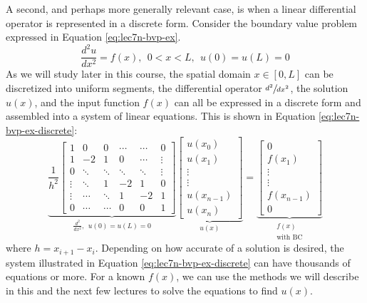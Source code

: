 A second, and perhaps more generally relevant case, is when a linear differential operator is represented in a discrete form.  Consider the boundary value problem expressed in Equation \ref{eq:lec7n-bvp-ex}.
\begin{equation}
\frac{d^2 u}{d x^2} = f(x), \ \ 0 < x < L, \ \ u(0) = u(L) = 0
\label{eq:lec7n-bvp-ex}
\end{equation}
As we will study later in this course, the spatial domain $x \in [0,L]$ can be discretized into uniform segments, the differential operator $\sfrac{d^2}{dx^2}$, the solution $u(x)$, and the input function $f(x)$ can all be expressed in a discrete form and assembled into a system of linear equations.  This is shown in Equation \ref{eq:lec7n-bvp-ex-discrete}:
\begin{equation}
\underbrace{
\frac{1}{h^2}
\left[
\begin{matrix}
1 & 0 & 0 & \cdots & \cdots &  0 \\
1 & -2 & 1 & 0 & \cdots & \vdots \\
0 & \ddots & \ddots & \ddots & \ddots& \vdots \\
\vdots &  \ddots & 1 & -2 & 1 &  0 \\
\vdots & \cdots & \ddots & 1 & -2 & 1  \\
0 & \cdots & \cdots & 0 & 0 & 1
\end{matrix}
\right]
}_{\frac{d^2}{dx^2}, \ \  u(0)=u(L)=0}
\underbrace{
\left[
\begin{matrix}
u(x_0) \\
u(x_1) \\
\vdots \\
\vdots \\
u(x_{n-1}) \\
u(x_n)
\end{matrix}
\right]
}_{u(x)}
=
\underbrace{
\left[
\begin{matrix}
0 \\
f(x_1) \\
\vdots \\
\vdots \\
f(x_{n-1}) \\
0
\end{matrix}
\right]
}_{\substack{f(x) \\ \text{with BC}}}
\label{eq:lec7n-bvp-ex-discrete}
\end{equation}
where $h = x_{i+1} - x_i$.  Depending on how accurate of a solution is desired, the system illustrated in Equation \ref{eq:lec7n-bvp-ex-discrete} can have thousands of equations or more.  For a known $f(x)$, we can use the methods we will describe in this and the next few lectures to solve the equations to find $u(x)$.

